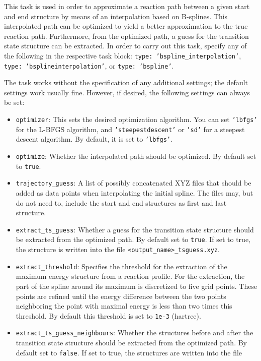 \documentclass[]{tufte-book}
\begin{document}
This task is used in order to approximate a reaction path between a given start and end structure by means of an
interpolation based on B-splines\cite{bsplines}. This interpolated path can be optimized to yield a better approximation
to the true reaction path. Furthermore, from the optimized path, a guess for the transition state structure can be
extracted. In order to carry out this task, specify any of the following in the respective task block: \texttt{type: 'bspline\_interpolation'},
\texttt{type: 'bsplineinterpolation'}, or \texttt{type: 'bspline'}.

The task works without the specification of any additional settings; the default settings work usually fine. However,
if desired, the following settings can always be set:
\begin{itemize}
\item \texttt{optimizer}: This sets the desired optimization algorithm. You can set \texttt{'lbfgs'} for the L-BFGS algorithm, and
\texttt{'steepestdescent'} or \texttt{'sd'} for a steepest descent algorithm. By default, it is set to \texttt{'lbfgs'}.
\item \texttt{optimize}: Whether the interpolated path should be optimized. By default set to \texttt{true}.
\item \texttt{trajectory\_guess}: A list of possibly concatenated XYZ files that should be added as data points when interpolating
the initial spline. The files may, but do not need to, include the start and end structures as first and last structure.
\item \texttt{extract\_ts\_guess}:  Whether a guess for the transition state structure should be extracted from the optimized
path. By default set to \texttt{true}. If set to true, the structure is written into the file \texttt{<output\_name>\_tsguess.xyz}.
\item \texttt{extract\_threshold}: Specifies the threshold for the extraction of the maximum energy structure from a
reaction profile. For the extraction, the part of the spline around its maximum is discretized to five grid points. These
points are refined until the energy difference between the two points neighboring the point with maximal energy is less
than two times this threshold. By default this threshold is set to \texttt{1e-3} (hartree).
\item \texttt{extract\_ts\_guess\_neighbours}: Whether the structures before and after the transition state structure should be
extracted from the optimized path. By default set to \texttt{false}. If set to true, the structures are written into the file

\end{itemize}
\end{document}
